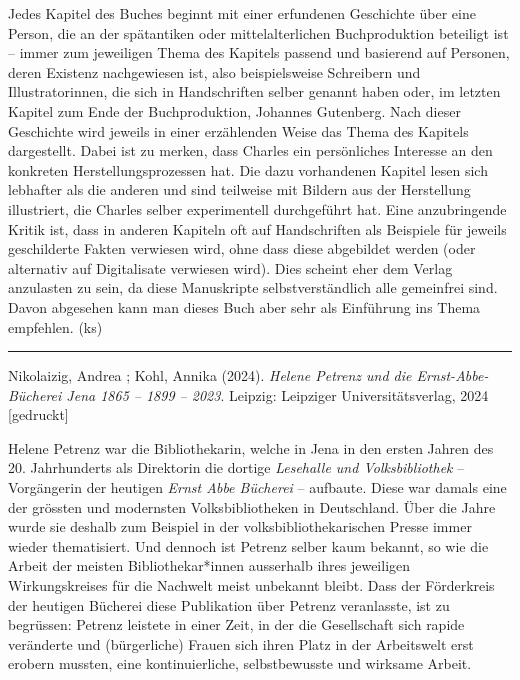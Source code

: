 \documentclass[a4paper,
fontsize=11pt,
oneside,
numbers=noperiodatend,
parskip=half-,
bibliography=totoc,
final
]{scrartcl}
\begin{document}
Jedes Kapitel des Buches beginnt mit einer erfundenen Geschichte über
eine Person, die an der spätantiken oder mittelalterlichen
Buchproduktion beteiligt ist -- immer zum jeweiligen Thema des Kapitels
passend und basierend auf Personen, deren Existenz nachgewiesen ist,
also beispielsweise Schreibern und Illustratorinnen, die sich in
Handschriften selber genannt haben oder, im letzten Kapitel zum Ende der
Buchproduktion, Johannes Gutenberg. Nach dieser Geschichte wird jeweils
in einer erzählenden Weise das Thema des Kapitels dargestellt. Dabei ist
zu merken, dass Charles ein persönliches Interesse an den konkreten
Herstellungsprozessen hat. Die dazu vorhandenen Kapitel lesen sich
lebhafter als die anderen und sind teilweise mit Bildern aus der
Herstellung illustriert, die Charles selber experimentell durchgeführt
hat. Eine anzubringende Kritik ist, dass in anderen Kapiteln oft auf
Handschriften als Beispiele für jeweils geschilderte Fakten verwiesen
wird, ohne dass diese abgebildet werden (oder alternativ auf
Digitalisate verwiesen wird). Dies scheint eher dem Verlag anzulasten zu
sein, da diese Manuskripte selbstverständlich alle gemeinfrei sind.
Davon abgesehen kann man dieses Buch aber sehr als Einführung ins Thema
empfehlen. (ks)

\begin{center}\rule{0.5\linewidth}{0.5pt}\end{center}

Nikolaizig, Andrea ; Kohl, Annika (2024). \emph{Helene Petrenz und die
Ernst-Abbe-Bücherei Jena 1865 -- 1899 -- 2023}. Leipzig: Leipziger
Universitätsverlag, 2024 {[}gedruckt{]}

Helene Petrenz war die Bibliothekarin, welche in Jena in den ersten
Jahren des 20. Jahrhunderts als Direktorin die dortige \emph{Lesehalle
und Volksbibliothek} -- Vorgängerin der heutigen \emph{Ernst Abbe
Bücherei} -- aufbaute. Diese war damals eine der grössten und modernsten
Volksbibliotheken in Deutschland. Über die Jahre wurde sie deshalb zum
Beispiel in der volksbibliothekarischen Presse immer wieder
thematisiert. Und dennoch ist Petrenz selber kaum bekannt, so wie die
Arbeit der meisten Bibliothekar*innen ausserhalb ihres jeweiligen
Wirkungskreises für die Nachwelt meist unbekannt bleibt. Dass der
Förderkreis der heutigen Bücherei diese Publikation über Petrenz
veranlasste, ist zu begrüssen: Petrenz leistete in einer Zeit, in der
die Gesellschaft sich rapide veränderte und (bürgerliche) Frauen sich
ihren Platz in der Arbeitswelt erst erobern mussten, eine
kontinuierliche, selbstbewusste und wirksame Arbeit.
\end{document}
